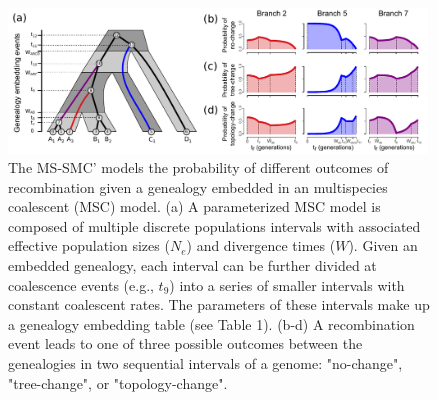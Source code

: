 \documentclass[11pt]{article}
\begin{document}


\begin{figure}
	\centering
	\includegraphics[width=0.99\textwidth]{figures/Fig1-embedding-and-probs-fill.pdf}
	\caption{
		The MS-SMC' models the probability of different outcomes of recombination
		given a genealogy embedded in an multispecies coalescent (MSC) model.
		(a) A parameterized MSC model is composed of multiple discrete populations
		intervals with associated effective population sizes ($N_e$) and divergence 
		times ($W$). Given an embedded genealogy, each interval can be further divided 
		at coalescence events (e.g., $t_9$) into a series of smaller intervals
		with constant coalescent rates. The parameters of these intervals make up a 
		genealogy embedding table (see Table 1).
		(b-d) A recombination event leads to one of three possible outcomes 
		between the genealogies in two sequential intervals of a genome: 
		"no-change", "tree-change", or "topology-change". 
}
\end{figure}
\end{document}
